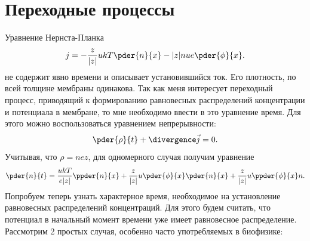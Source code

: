 \chapter{Переходные процессы}
    Уравнение Нернста-Планка
    \begin{equation}
        j = -\frac{z}{|z|}ukT\pder{n}{x} - |z|nue\pder{\phi}{x}.
        \label{eq:nernst-plank}
    \end{equation}
    не содержит явно времени и описывает установившийся ток. Его плотность,
    по всей толщине мембраны одинакова. Так как меня интересует переходный
    процесс, приводящий к формированию равновесных распределений концентрации
    и потенциала в мембране, то мне необходимо ввести в это уравнение время.
    Для этого можно воспользоваться уравнением непрерывности:
    \begin{equation}
        \pder{\rho}{t} + \divergence\vec{j} = 0.
    \end{equation}
    Учитывая, что \( \rho = nez \), для одномерного случая получим уравнение
    \begin{equation}
        \pder{n}{t} = \frac{ukT}{e|z|}\ppder{n}{x} +
            \frac{z}{|z|}u\pder{\phi}{x}\pder{n}{x} +
            \frac{z}{|z|}u\ppder{\phi}{x}n.
        \label{eq:nernst-plank_with_time}
    \end{equation}
    Попробуем теперь узнать характерное время, необходимое на установление
    равновесных распределений концентраций. Для этого будем считать, что
    потенциал в начальный момент времени уже имеет равновесное
    распределение. Рассмотрим 2 простых случая, особенно часто употребляемых в
    биофизике:
